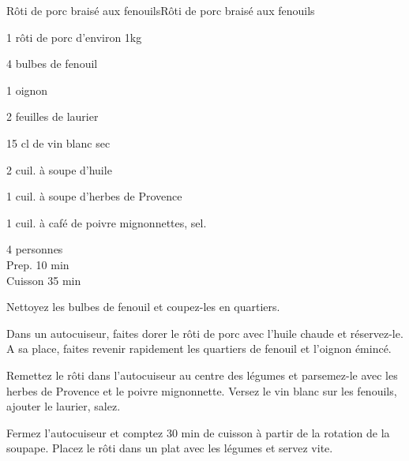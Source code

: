 \begin{recette}{Rôti de porc braisé aux fenouils}{Rôti de porc braisé aux fenouils}

\begin{ingredients}
1 rôti de porc d’environ 1kg\par
4 bulbes de fenouil\par
1 oignon\par
2 feuilles de laurier\par
15 cl de vin blanc sec\par
2 cuil. à soupe d’huile\par
1 cuil. à soupe d’herbes de Provence\par
1 cuil. à café de poivre mignonnettes, sel.\par
\end{ingredients}

\begin{infos}
4 personnes\\
Prep. 10 min\\
Cuisson 35 min\\
\end{infos}

\begin{etapes}
\item Nettoyez les bulbes de fenouil et coupez-les en quartiers.
\item Dans un autocuiseur, faites dorer le rôti de porc avec l’huile chaude et réservez-le. A sa place, faites revenir rapidement les quartiers de fenouil et l’oignon émincé.
\item Remettez le rôti dans l’autocuiseur au centre des légumes et parsemez-le avec les herbes de Provence et le poivre mignonnette. Versez le vin blanc sur les fenouils, ajouter le laurier, salez.
\item Fermez l’autocuiseur et comptez 30 min de cuisson à partir de la rotation de la soupape. Placez le rôti dans un plat avec les légumes et servez vite.
\end{etapes}

\end{recette}